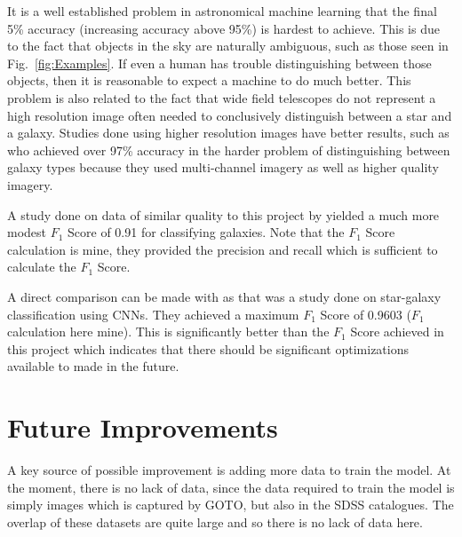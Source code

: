 \documentclass[a4paper,fleqn,usenatbib]{mnras}
\begin{document}
It is a well established problem in astronomical machine learning that the final 5\% accuracy (increasing accuracy above 95\%) is hardest to achieve. This is due to the fact that objects in the sky are naturally ambiguous, such as those seen in Fig.~\ref{fig:Examples}. If even a human has trouble distinguishing between those objects, then it is reasonable to expect a machine to do much better. This problem is also related to the fact that wide field telescopes do not represent a high resolution image often needed to conclusively distinguish between a star and a galaxy. Studies done using higher resolution images have better results, such as \citet{Khalifa2017} who achieved over 97\% accuracy in the harder problem of distinguishing between galaxy types because they used multi-channel imagery as well as higher quality imagery. 

A study done on data of similar quality to this project by \citet{Aniyan2017} yielded a much more modest $F_1$ Score of 0.91 for classifying galaxies. Note that the $F_1$ Score calculation is mine, they provided the precision and recall which is sufficient to calculate the $F_1$ Score. 

A direct comparison can be made with \citet{Kim2016} as that was a study done on star-galaxy classification using CNNs. They achieved a maximum $F_1$ Score of 0.9603 ($F_1$ calculation here mine). This is significantly better than the $F_1$ Score achieved in this project which indicates that there should be significant optimizations available to made in the future.

\section{Future Improvements}
A key source of possible improvement is adding more data to train the model. At the moment, there is no lack of data, since the data required to train the model is simply images which is captured by GOTO, but also in the SDSS catalogues. The overlap of these datasets are quite large and so there is no lack of data here. 
\end{document}
